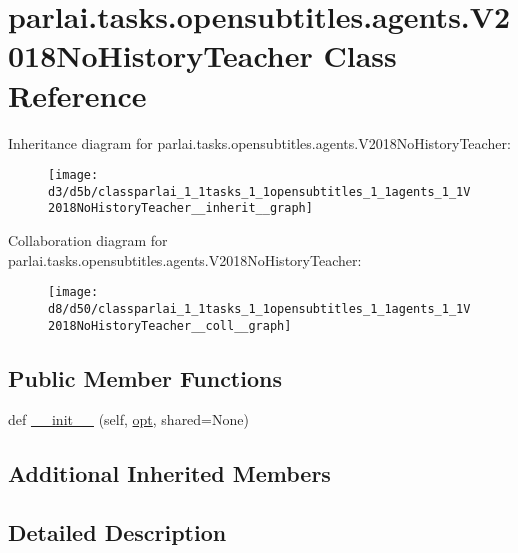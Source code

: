 \hypertarget{classparlai_1_1tasks_1_1opensubtitles_1_1agents_1_1V2018NoHistoryTeacher}{}\section{parlai.\+tasks.\+opensubtitles.\+agents.\+V2018\+No\+History\+Teacher Class Reference}
\label{classparlai_1_1tasks_1_1opensubtitles_1_1agents_1_1V2018NoHistoryTeacher}


Inheritance diagram for parlai.\+tasks.\+opensubtitles.\+agents.\+V2018\+No\+History\+Teacher\+:\nopagebreak
\begin{figure}[H]
\begin{center}
\leavevmode
\texttt{[image: d3/d5b/classparlai\_1\_1tasks\_1\_1opensubtitles\_1\_1agents\_1\_1V2018NoHistoryTeacher\_\_inherit\_\_graph]}
\end{center}
\end{figure}


Collaboration diagram for parlai.\+tasks.\+opensubtitles.\+agents.\+V2018\+No\+History\+Teacher\+:\nopagebreak
\begin{figure}[H]
\begin{center}
\leavevmode
\texttt{[image: d8/d50/classparlai\_1\_1tasks\_1\_1opensubtitles\_1\_1agents\_1\_1V2018NoHistoryTeacher\_\_coll\_\_graph]}
\end{center}
\end{figure}
\subsection*{Public Member Functions}
\begin{DoxyCompactItemize}
\item 
def \hyperlink{classparlai_1_1tasks_1_1opensubtitles_1_1agents_1_1V2018NoHistoryTeacher_a8341ce8f3cf5d53180d47db11ac0d397}{\+\_\+\+\_\+init\+\_\+\+\_\+} (self, \hyperlink{classparlai_1_1core_1_1teachers_1_1FbDialogTeacher_af7a9ec497b9cd0292d7b8fa220da7c28}{opt}, shared=None)
\end{DoxyCompactItemize}
\subsection*{Additional Inherited Members}


\subsection{Detailed Description}


